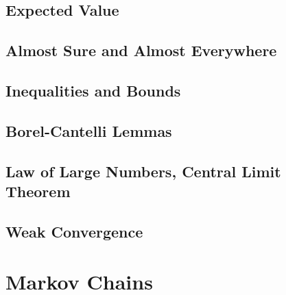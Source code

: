 \documentclass[12pt, titlepage]{article}
\begin{document}
\subsection{Expected Value}

\subsection{Almost Sure and Almost Everywhere}

\subsection{Inequalities and Bounds}

\subsection{Borel-Cantelli Lemmas}

\subsection{Law of Large Numbers, Central Limit Theorem}

\subsection{Weak Convergence}

\section{Markov Chains}
\end{document}
